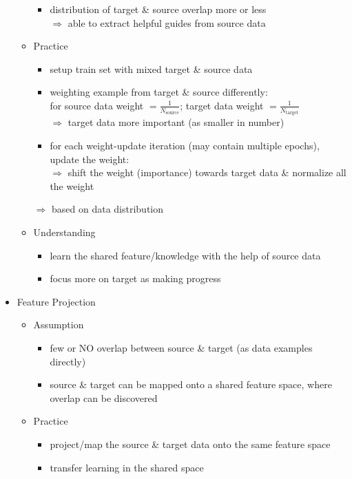 \begin{itemize}
\begin{itemize}
		\begin{itemize}
		\item distribution of target \& source overlap more or less \\
		$\Rightarrow$ able to extract helpful guides from source data
		\end{itemize}
	\item Practice
		\begin{itemize}
		\item setup train set with mixed target \& source data
		\item weighting example from target \& source differently: \\ 
		for source data weight $= \frac 1 {N_\text{source}}$; target data weight $= \frac 1 {N_\text{target}}$ \\
		$\Rightarrow$ target data more important (as smaller in number)
		\item for each weight-update iteration (may contain multiple epochs), update the weight: \\
		$\Rightarrow$ shift the weight (importance) towards target data \& normalize all the weight
		\end{itemize}
		$\Rightarrow$ based on data distribution
	\item Understanding
		\begin{itemize}
		\item learn the shared feature/knowledge with the help of source data
		\item focus more on target as making progress
		\end{itemize}
	\end{itemize}
\item Feature Projection
	\begin{itemize}
	\item Assumption
		\begin{itemize}
		\item few or NO overlap between source \& target (as data examples directly)
		\item source \& target can be mapped onto a shared feature space, where overlap can be discovered
		\end{itemize}
	\item Practice
		\begin{itemize}
		\item project/map the source \& target data onto the same feature space
		\item transfer learning in the shared space
		\end{itemize}

\end{itemize}
\end{itemize}
